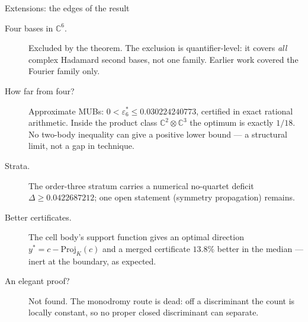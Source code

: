 \documentclass[aspectratio=169,10pt]{beamer}
\newcommand{\C}{\mathbb{C}}
\begin{document}
\begin{frame}{Extensions: the edges of the result}
  \small
  \begin{description}
    \item[Four bases in $\C^6$.] Excluded by the theorem. The exclusion is quantifier-level: it
      covers \emph{all} complex Hadamard second bases, not one family. Earlier work covered the
      Fourier family only.
    \item[How far from four?] Approximate MUBs: $0<\varepsilon_6^{*}\le0.030224240773$, certified in
      exact rational arithmetic. Inside the product class $\C^2\otimes\C^3$ the optimum is exactly
      $1/18$. No two-body inequality can give a positive lower bound --- a structural limit, not a
      gap in technique.
    \item[Strata.] The order-three stratum carries a numerical no-quartet deficit
      $\Delta\ge0.0422687212$; one open statement (symmetry propagation) remains.
    \item[Better certificates.] The cell body's support function gives an optimal direction
      $y^{*}=c-\mathrm{Proj}_K(c)$ and a merged certificate $13.8\%$ better in the median --- inert
      at the boundary, as expected.
    \item[An elegant proof?] Not found. The monodromy route is dead: off a discriminant the count is
      locally constant, so no proper closed discriminant can separate.
  \end{description}
\end{frame}
\end{document}
